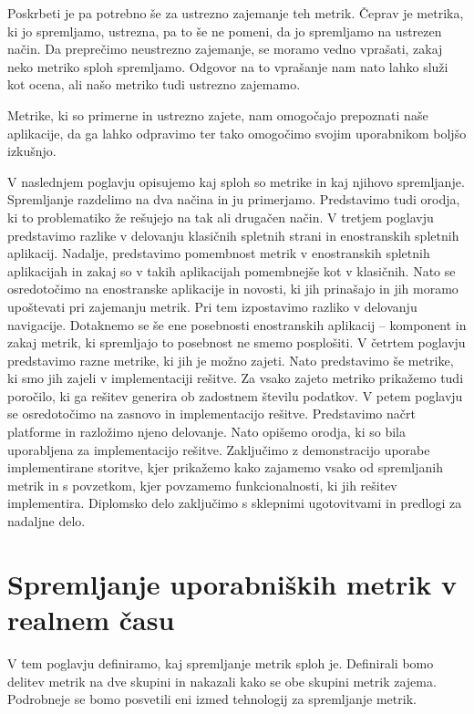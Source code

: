 \documentclass[a4paper, 12pt]{book}
\begin{document}
Poskrbeti je pa potrebno še za ustrezno zajemanje teh metrik. Čeprav je metrika, ki jo spremljamo, ustrezna, pa to še ne pomeni, da jo spremljamo na ustrezen način. Da preprečimo neustrezno zajemanje, se moramo vedno vprašati, zakaj neko metriko sploh spremljamo. Odgovor na to vprašanje nam nato lahko služi kot ocena, ali našo metriko tudi ustrezno zajemamo.

Metrike, ki so primerne in ustrezno zajete, nam omogočajo prepoznati  naše aplikacije, da ga lahko odpravimo ter tako omogočimo svojim uporabnikom boljšo izkušnjo.

V naslednjem poglavju opisujemo kaj sploh so metrike in kaj njihovo spremljanje. Spremljanje razdelimo na dva načina in ju primerjamo. Predstavimo tudi orodja, ki to problematiko že rešujejo na tak ali drugačen način. V tretjem poglavju predstavimo razlike v delovanju klasičnih spletnih strani in enostranskih spletnih aplikacij. Nadalje, predstavimo pomembnost metrik v enostranskih spletnih aplikacijah in zakaj so v takih aplikacijah pomembnejše kot v klasičnih. Nato se osredotočimo na enostranske aplikacije in novosti, ki jih prinašajo in jih moramo upoštevati pri zajemanju metrik. Pri tem izpostavimo razliko v delovanju navigacije. Dotaknemo se še ene posebnosti enostranskih aplikacij -- komponent in zakaj metrik, ki spremljajo to posebnost ne smemo posplošiti. V četrtem poglavju predstavimo razne metrike, ki jih je možno zajeti. Nato predstavimo še metrike, ki smo jih zajeli v implementaciji rešitve. Za vsako zajeto metriko prikažemo tudi poročilo, ki ga rešitev generira ob zadostnem številu podatkov. V petem poglavju se osredotočimo na zasnovo in implementacijo rešitve. Predstavimo načrt platforme in razložimo njeno delovanje. Nato opišemo orodja, ki so bila uporabljena za implementacijo rešitve. Zaključimo z demonstracijo uporabe implementirane storitve, kjer prikažemo kako zajamemo vsako od spremljanih metrik in s povzetkom, kjer povzamemo funkcionalnosti, ki jih rešitev implementira. Diplomsko delo zaključimo s sklepnimi ugotovitvami in predlogi za nadaljne delo.

\chapter{Spremljanje uporabniških metrik v realnem času}
\label{ch0}
V tem poglavju definiramo, kaj spremljanje metrik sploh je. Definirali bomo delitev metrik na dve skupini in nakazali kako se obe skupini metrik zajema. Podrobneje se bomo posvetili eni izmed tehnologij za spremljanje metrik.
\end{document}

